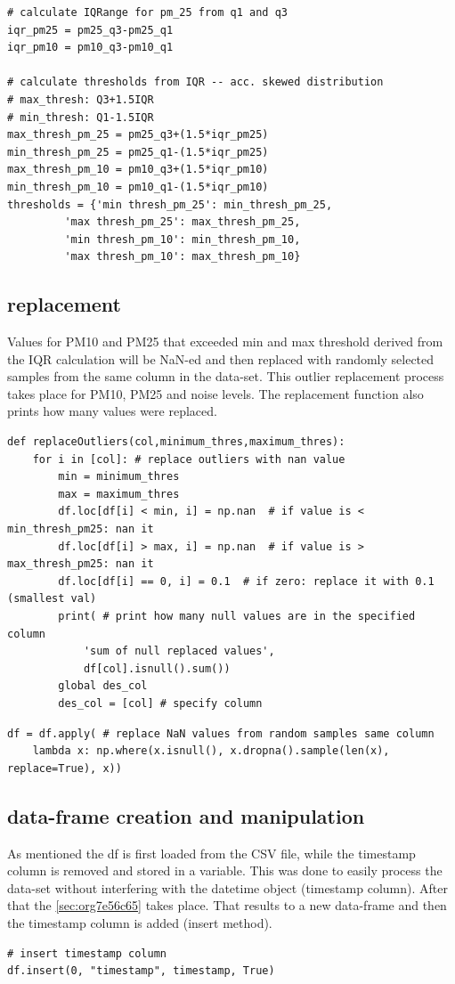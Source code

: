 \documentclass[11pt]{article}
\begin{document}
\begin{verbatim}
# calculate IQRange for pm_25 from q1 and q3
iqr_pm25 = pm25_q3-pm25_q1
iqr_pm10 = pm10_q3-pm10_q1

# calculate thresholds from IQR -- acc. skewed distribution
# max_thresh: Q3+1.5IQR
# min_thresh: Q1-1.5IQR
max_thresh_pm_25 = pm25_q3+(1.5*iqr_pm25)
min_thresh_pm_25 = pm25_q1-(1.5*iqr_pm25)
max_thresh_pm_10 = pm10_q3+(1.5*iqr_pm10)
min_thresh_pm_10 = pm10_q1-(1.5*iqr_pm10)
thresholds = {'min thresh_pm_25': min_thresh_pm_25,
         'max thresh_pm_25': max_thresh_pm_25,
         'min thresh_pm_10': min_thresh_pm_10,
         'max thresh_pm_10': max_thresh_pm_10}
\end{verbatim}

\subsection{replacement}
\label{sec:org208965b}
Values for PM10 and PM25 that exceeded min and max threshold derived from the IQR calculation will be NaN-ed and then replaced with randomly selected samples from the same column in the data-set.  This outlier replacement process takes place for PM10, PM25 and noise levels.  The replacement function also prints how many values were replaced.

\begin{verbatim}
def replaceOutliers(col,minimum_thres,maximum_thres):
    for i in [col]: # replace outliers with nan value
        min = minimum_thres
        max = maximum_thres
        df.loc[df[i] < min, i] = np.nan  # if value is < min_thresh_pm25: nan it
        df.loc[df[i] > max, i] = np.nan  # if value is > max_thresh_pm25: nan it
        df.loc[df[i] == 0, i] = 0.1  # if zero: replace it with 0.1 (smallest val)
        print( # print how many null values are in the specified column
            'sum of null replaced values',
            df[col].isnull().sum())
        global des_col
        des_col = [col] # specify column
\end{verbatim}

\begin{verbatim}
df = df.apply( # replace NaN values from random samples same column
    lambda x: np.where(x.isnull(), x.dropna().sample(len(x), replace=True), x))
\end{verbatim}

\subsection{data-frame creation and manipulation}
\label{sec:org785d4a9}
As mentioned the df is first loaded from the CSV file, while the timestamp column is removed and stored in a variable.  This was done to easily process the data-set without interfering with the datetime object (timestamp column).  After that the \ref{sec:org7e56c65} takes place.  That results to a new data-frame and then the timestamp column is added (insert method).
\begin{verbatim}
# insert timestamp column
df.insert(0, "timestamp", timestamp, True)
\end{verbatim}
\end{document}
